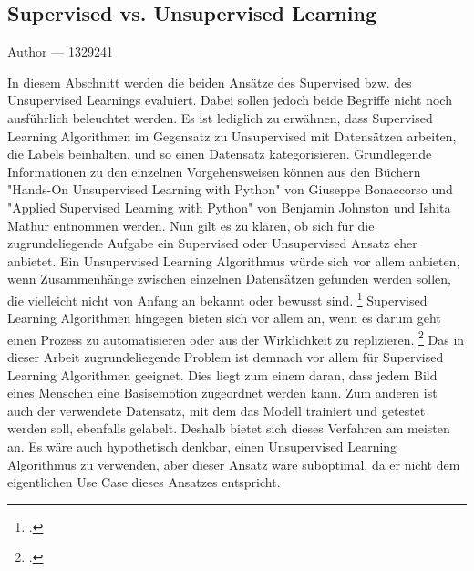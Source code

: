 \documentclass[12pt, a4paper]{report}
\makeatletter
\newcommand{\sectionauthor}[1]{%
  {\parindent0pt\vspace*{-5pt}%
  \large{Author --- }
  \linespread{1.1}\large\scshape#1%
  \par\nobreak\vspace*{35pt} }
  \@afterheading%
}
\makeatother
\begin{document}
\subsection{Supervised vs. Unsupervised Learning}
\sectionauthor{1329241}
In diesem Abschnitt werden die beiden Ansätze des Supervised bzw. des Unsupervised Learnings evaluiert. Dabei sollen jedoch beide Begriffe nicht noch ausführlich beleuchtet werden. Es ist lediglich zu erwähnen, dass Supervised Learning Algorithmen im Gegensatz zu Unsupervised mit Datensätzen arbeiten, die Labels beinhalten, und so einen Datensatz kategorisieren. Grundlegende Informationen zu den einzelnen Vorgehensweisen können aus den Büchern "Hands-On Unsupervised Learning with Python" von Giuseppe Bonaccorso und "Applied Supervised Learning with Python" von Benjamin Johnston und Ishita Mathur entnommen werden. Nun gilt es zu klären, ob sich für die zugrundeliegende Aufgabe ein Supervised oder Unsupervised Ansatz eher anbietet. Ein Unsupervised Learning Algorithmus würde sich vor allem anbieten, wenn Zusammenhänge zwischen einzelnen Datensätzen gefunden werden sollen, die vielleicht nicht von Anfang an bekannt oder bewusst sind.
\footcite[Vgl. ][21]{Unsupervised}
Supervised Learning Algorithmen hingegen bieten sich vor allem an, wenn es darum geht einen Prozess zu automatisieren oder aus der Wirklichkeit zu replizieren.
\footcite[Vgl. ][4]{Supervised}
Das in dieser Arbeit zugrundeliegende Problem ist demnach vor allem für Supervised Learning Algorithmen geeignet. Dies liegt zum einem daran, dass jedem Bild eines Menschen eine Basisemotion zugeordnet werden kann. Zum anderen ist auch der verwendete Datensatz, mit dem das Modell trainiert und getestet werden soll, ebenfalls gelabelt. Deshalb bietet sich dieses Verfahren am meisten an. Es wäre auch hypothetisch denkbar, einen Unsupervised Learning Algorithmus zu verwenden, aber dieser Ansatz wäre suboptimal, da er nicht dem eigentlichen Use Case dieses Ansatzes entspricht.
\end{document}
